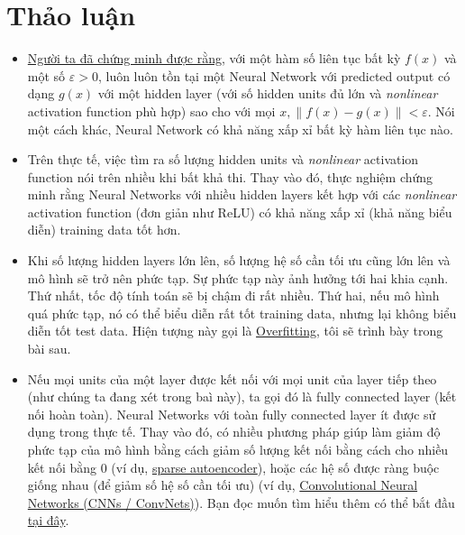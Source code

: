  
\section{Thảo luận}
\begin{itemize}
    \item \href{http://www.dartmouth.edu/~gvc/Cybenko_MCSS.pdf}{Người ta đã chứng minh được rằng}, với một hàm số liên tục bất kỳ $f(x)$ và một số $\varepsilon >0$, luôn luôn tồn tại một Neural Network với predicted output có dạng $g(x)$ với một hidden layer (với số hidden units đủ lớn và \textit{nonlinear} activation function phù hợp) sao cho với mọi $x, \|f(x) - g(x)\| < \varepsilon$. Nói một cách khác, Neural Network có khả năng xấp xỉ bất kỳ hàm liên tục nào. 
     
    \item Trên thực tế, việc tìm ra số lượng hidden units và \textit{nonlinear} activation function nói trên nhiều khi bất khả thi. Thay vào đó, thực nghiệm chứng minh rằng Neural Networks với nhiều hidden layers kết hợp với các \textit{nonlinear} activation function (đơn giản như ReLU) có khả năng xấp xỉ (khả năng biểu diễn) training data tốt hơn. 
     
    \item Khi số lượng hidden layers lớn lên, số lượng hệ số cần tối ưu cũng lớn lên và mô hình sẽ trở nên phức tạp. Sự phức tạp này ảnh hưởng tới hai khia cạnh. Thứ nhất, tốc độ tính toán sẽ bị chậm đi rất nhiều. Thứ hai, nếu mô hình quá phức tạp, nó có thể biểu diễn rất tốt training data, nhưng lại không biểu diễn tốt test data. Hiện tượng này gọi là \href{https://en.wikipedia.org/wiki/Overfitting}{Overfitting}, tôi sẽ trình bày trong bài sau. 
     
    \item Nếu mọi units của một layer được kết nối với mọi unit của layer tiếp theo (như chúng ta đang xét trong baì này), ta gọi đó là fully connected layer (kết nối hoàn toàn). Neural Networks với toàn fully connected layer ít được sử dụng trong thực tế. Thay vào đó, có nhiều phương pháp giúp làm giảm độ phức tạp của mô hình bằng cách giảm số lượng kết nối bằng cách cho nhiều kết nối bằng 0 (ví dụ, \href{https://web.stanford.edu/class/cs294a/sparseAutoencoder_2011new.pdf}{sparse autoencoder}), hoặc các hệ số được ràng buộc giống nhau (để giảm số hệ số cần tối ưu) (ví dụ, \href{http://cs231n.github.io/convolutional-networks/}{Convolutional Neural Networks (CNNs / ConvNets)}). Bạn đọc muốn tìm hiểu thêm có thể bắt đầu \href{http://deeplearning.net}{tại đây}. 
     

\end{itemize}
